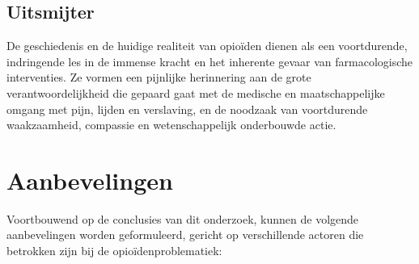 \documentclass[11pt, a4paper]{report} %
\begin{document}
\section{Uitsmijter}
De geschiedenis en de huidige realiteit van opioïden dienen als een voortdurende, indringende les in de immense kracht en het inherente gevaar van farmacologische interventies. Ze vormen een pijnlijke herinnering aan de grote verantwoordelijkheid die gepaard gaat met de medische en maatschappelijke omgang met pijn, lijden en verslaving, en de noodzaak van voortdurende waakzaamheid, compassie en wetenschappelijk onderbouwde actie.


\chapter{Aanbevelingen}
\label{chap:aanbevelingen}

Voortbouwend op de conclusies van dit onderzoek, kunnen de volgende aanbevelingen worden geformuleerd, gericht op verschillende actoren die betrokken zijn bij de opioïdenproblematiek:
\end{document}
